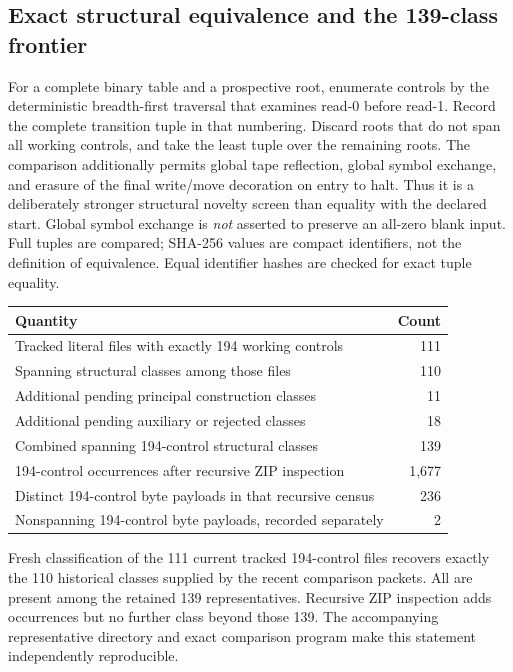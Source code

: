 \subsection{Exact structural equivalence and the 139-class frontier}

For a complete binary table and a prospective root, enumerate controls by
the deterministic breadth-first traversal that examines read-0 before
read-1. Record the complete transition tuple in that numbering. Discard
roots that do not span all working controls, and take the least tuple over
the remaining roots. The comparison additionally permits global tape
reflection, global symbol exchange, and erasure of the final write/move
decoration on entry to halt. Thus it is a deliberately stronger structural
novelty screen than equality with the declared start. Global symbol exchange
is \emph{not} asserted to preserve an all-zero blank input. Full tuples are
compared; SHA-256 values are compact identifiers, not the definition of
equivalence. Equal identifier hashes are checked for exact tuple equality.

\begin{center}
\begin{tabular}{lr}
\toprule
Quantity & Count\\
\midrule
Tracked literal files with exactly 194 working controls & 111\\
Spanning structural classes among those files & 110\\
Additional pending principal construction classes & 11\\
Additional pending auxiliary or rejected classes & 18\\
Combined spanning 194-control structural classes & 139\\
194-control occurrences after recursive ZIP inspection & 1,677\\
Distinct 194-control byte payloads in that recursive census & 236\\
Nonspanning 194-control byte payloads, recorded separately & 2\\
\bottomrule
\end{tabular}
\end{center}

Fresh classification of the 111 current tracked 194-control files recovers
exactly the 110 historical classes supplied by the recent comparison
packets. All are present among the retained 139 representatives. Recursive
ZIP inspection adds occurrences but no further class beyond those 139.
The accompanying representative directory and exact comparison program
make this statement independently reproducible.

